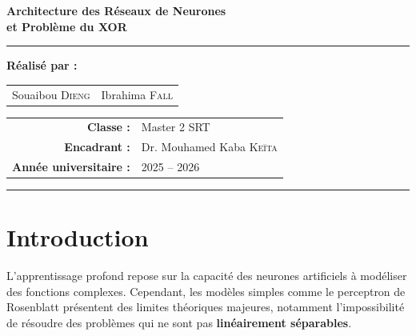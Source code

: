 \documentclass[12pt, a4paper]{article}
\begin{document}
\begin{titlepage}
    \vspace{0.3cm}

    {\LARGE\bfseries\color{espblue}
        Architecture des Réseaux de Neurones\\[5pt]
        et Problème du XOR
    }

    \vspace{0.3cm}
    {\color{espgold}\rule{0.8\linewidth}{1.5pt}}
    \vspace{0.5cm}

    \Large\bfseries Réalisé par :\\[0.4cm]
    \begin{tabular}{cc}
        \Large\color{espblue} Souaibou \textsc{Dieng} &
        \Large\color{espblue} Ibrahima \textsc{Fall} \\
    \end{tabular}

    \vfill

    \begin{tabular}{rl}
        \textbf{Classe :}              & Master 2 SRT \\[3pt]
        \textbf{Encadrant :}           & Dr. Mouhamed Kaba \textsc{Keïta} \\[3pt]
        \textbf{Année universitaire :} & 2025 -- 2026 \\
    \end{tabular}

    \vspace{0.4cm}
    {\color{espblue}\rule{\linewidth}{3pt}}
\end{titlepage}

\tableofcontents
\thispagestyle{fancy}
\newpage

\section*{Introduction}

L'apprentissage profond repose sur la capacité des neurones artificiels à modéliser
des fonctions complexes. Cependant, les modèles simples comme le perceptron de Rosenblatt
présentent des limites théoriques majeures, notamment l'impossibilité de résoudre des
problèmes qui ne sont pas \textbf{linéairement séparables}.
\end{document}
